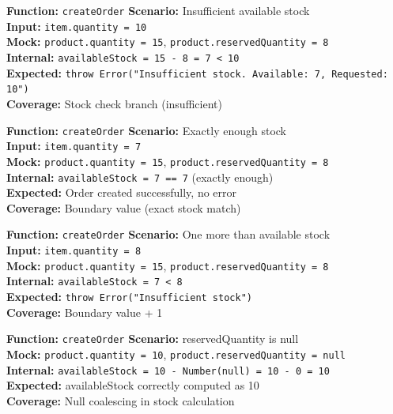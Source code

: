 ﻿\documentclass[12pt,a4paper]{report}
\newcommand{\ptwo}{\textbf{\color{p2orange}P2}}
\newcommand{\pthree}{\textbf{\color{p3blue}P3}}
\begin{document}
\begin{tcolorbox}[criticalbox,title={ORD-004 \hfill \ptwo\ --- Insufficient Stock}]
\textbf{Function:} \texttt{createOrder} \quad \textbf{Scenario:} Insufficient available stock \\
\textbf{Input:} \texttt{item.quantity = 10} \\
\textbf{Mock:} \texttt{product.quantity = 15}, \texttt{product.reservedQuantity = 8} \\
\textbf{Internal:} \texttt{availableStock = 15 - 8 = 7 < 10} \\
\textbf{Expected:} \texttt{throw Error("Insufficient stock. Available: 7, Requested: 10")} \\
\textbf{Coverage:} Stock check branch (insufficient)
\end{tcolorbox}

\begin{tcolorbox}[testbox,title={ORD-005 \hfill \pthree\ --- Boundary}]
\textbf{Function:} \texttt{createOrder} \quad \textbf{Scenario:} Exactly enough stock \\
\textbf{Input:} \texttt{item.quantity = 7} \\
\textbf{Mock:} \texttt{product.quantity = 15}, \texttt{product.reservedQuantity = 8} \\
\textbf{Internal:} \texttt{availableStock = 7 == 7} (exactly enough) \\
\textbf{Expected:} Order created successfully, no error \\
\textbf{Coverage:} Boundary value (exact stock match)
\end{tcolorbox}

\begin{tcolorbox}[testbox,title={ORD-006 \hfill \pthree\ --- Boundary+1}]
\textbf{Function:} \texttt{createOrder} \quad \textbf{Scenario:} One more than available stock \\
\textbf{Input:} \texttt{item.quantity = 8} \\
\textbf{Mock:} \texttt{product.quantity = 15}, \texttt{product.reservedQuantity = 8} \\
\textbf{Internal:} \texttt{availableStock = 7 < 8} \\
\textbf{Expected:} \texttt{throw Error("Insufficient stock")} \\
\textbf{Coverage:} Boundary value + 1
\end{tcolorbox}

\begin{tcolorbox}[testbox,title={ORD-007 \hfill \pthree}]
\textbf{Function:} \texttt{createOrder} \quad \textbf{Scenario:} reservedQuantity is null \\
\textbf{Mock:} \texttt{product.quantity = 10}, \texttt{product.reservedQuantity = null} \\
\textbf{Internal:} \texttt{availableStock = 10 - Number(null) = 10 - 0 = 10} \\
\textbf{Expected:} availableStock correctly computed as 10 \\
\textbf{Coverage:} Null coalescing in stock calculation
\end{tcolorbox}
\end{document}
